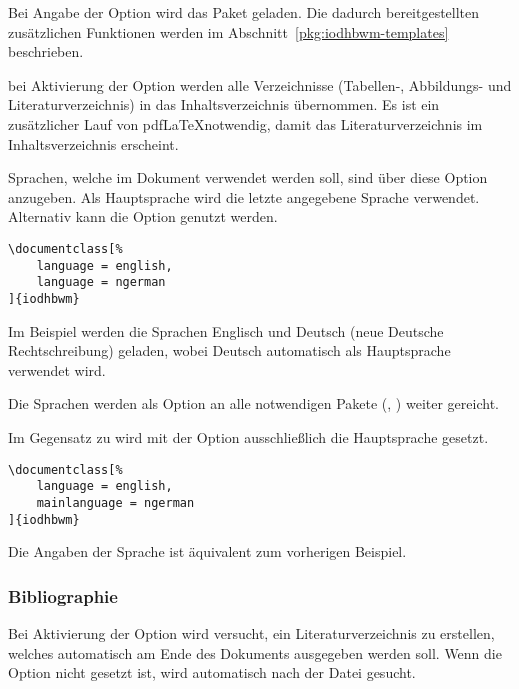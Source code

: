 \documentclass[babel=ngerman,highlight=false]{skdoc}
\begin{document}
                Bei Angabe der Option wird das Paket  geladen. Die dadurch bereitgestellten zusätzlichen Funktionen werden im Abschnitt~\ref{pkg:iodhbwm-templates} beschrieben.\medskip

                bei Aktivierung der Option werden alle Verzeichnisse (Tabellen-, Abbildungs- und Literaturverzeichnis) in das Inhaltsverzeichnis übernommen. Es ist ein zusätzlicher Lauf von pdf\LaTeX notwendig, damit das Literaturverzeichnis im Inhaltsverzeichnis erscheint.
                \medskip

                Sprachen, welche im Dokument verwendet werden soll, sind über diese Option anzugeben. Als Hauptsprache wird die letzte angegebene Sprache verwendet. Alternativ kann die Option  genutzt werden.

                \begin{verbatim}
\documentclass[%
    language = english,
    language = ngerman
]{iodhbwm}
                \end{verbatim}
                Im Beispiel werden die Sprachen Englisch und Deutsch (neue Deutsche Rechtschreibung) geladen, wobei Deutsch automatisch als Hauptsprache verwendet wird.

                Die Sprachen werden als Option an alle notwendigen Pakete (, ) weiter gereicht.\medskip

                \AndDefault{}\medskip
                Im Gegensatz zu  wird mit der Option ausschließlich die Hauptsprache gesetzt.

                \begin{verbatim}
\documentclass[%
    language = english,
    mainlanguage = ngerman
]{iodhbwm}
                \end{verbatim}
                Die Angaben der Sprache ist äquivalent zum vorherigen Beispiel.\medskip

            \subsubsection{Bibliographie}
                Bei Aktivierung der Option wird versucht, ein Literaturverzeichnis zu erstellen, welches automatisch am Ende des Dokuments ausgegeben werden soll. Wenn die Option  nicht gesetzt ist, wird automatisch nach der Datei  gesucht.
\end{document}
